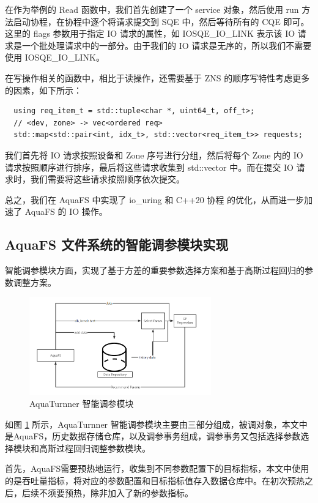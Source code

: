 在作为举例的 Read 函数中，我们首先创建了一个 service 对象，然后使用 run 方法启动协程，在协程中逐个将请求提交到 SQE 中，然后等待所有的 CQE 即可。这里的 flags 参数用于指定 IO 请求的属性，如 IOSQE\_IO\_LINK 表示该 IO 请求是一个批处理请求中的一部分。由于我们的 IO 请求是无序的，所以我们不需要使用 IOSQE\_IO\_LINK。

在写操作相关的函数中，相比于读操作，还需要基于 ZNS 的顺序写特性考虑更多的因素，如下所示：

\begin{lstlisting}
  using req_item_t = std::tuple<char *, uint64_t, off_t>;
  // <dev, zone> -> vec<ordered req>
  std::map<std::pair<int, idx_t>, std::vector<req_item_t>> requests;
\end{lstlisting}

我们首先将 IO 请求按照设备和 Zone 序号进行分组，然后将每个 Zone 内的 IO 请求按照顺序进行排序，最后将这些请求收集到 std::vector 中。而在提交 IO 请求时，我们需要将这些请求按照顺序依次提交。

总之，我们在 AquaFS 中实现了 io\_uring 和 C++20 协程 的优化，从而进一步加速了 AquaFS 的 IO 操作。

\subsection{AquaFS 文件系统的智能调参模块实现}

智能调参模块方面，实现了基于方差的重要参数选择方案和基于高斯过程回归的参数调整方案。

\begin{figure}[htbp]
  \centering
  \includegraphics[width=0.7\textwidth]{fig/aquaturnner}
  \caption{AquaTurnner 智能调参模块}
  \label{aquaturnner}
\end{figure}

如图 \ref{aquaturnner} 所示，AquaTurnner 智能调参模块主要由三部分组成，被调对象，本文中是AquaFS，历史数据存储仓库，以及调参事务组成，调参事务又包括选择参数选择模块和高斯过程回归调整参数模块。

首先，AquaFS需要预热地运行，收集到不同参数配置下的目标指标，本文中使用的是吞吐量指标，将对应的参数配置和目标指标值存入数据仓库中。在初次预热之后，后续不须要预热，除非加入了新的参数指标。

